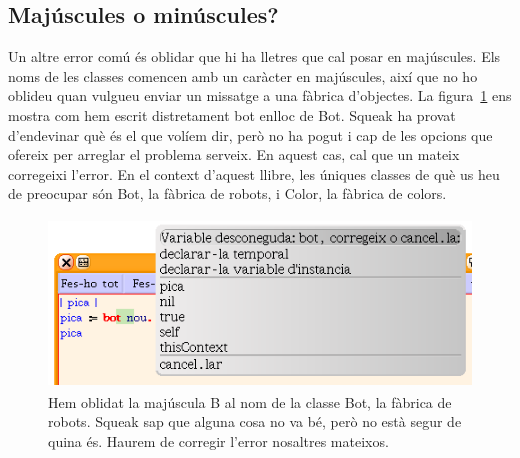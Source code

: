 \subsection{Majúscules o minúscules?}
Un altre error comú és oblidar que hi ha lletres que cal posar en majúscules. Els noms de les classes comencen amb un caràcter en majúscules, així que no ho oblideu quan vulgueu enviar un missatge a una fàbrica d'objectes. La figura~\ref{fig0208} ens mostra com hem escrit distretament \textsf{bot} enlloc de \textsf{Bot}. Squeak ha provat d'endevinar què és el que volíem dir, però no ha pogut i cap de les opcions que ofereix per arreglar el problema serveix. En aquest cas, cal que un mateix corregeixi l'error. En el context d'aquest llibre, les úniques classes de què us heu de preocupar són \textsf{Bot}, la fàbrica de robots, i \textsf{Color}, la fàbrica de colors.
\begin{figure}[h!]
\begin{center}
\includegraphics[height=45mm ,width=116mm ]{Imatges/figura2-8.png}
\end{center}
\caption{Hem oblidat la majúscula B al nom de la classe \textsf{\upshape Bot}, la fàbrica de robots. Squeak sap que alguna cosa no va bé, però no està segur de quina és. Haurem de corregir l'error nosaltres mateixos.}
\label{fig0208}
\end{figure}

